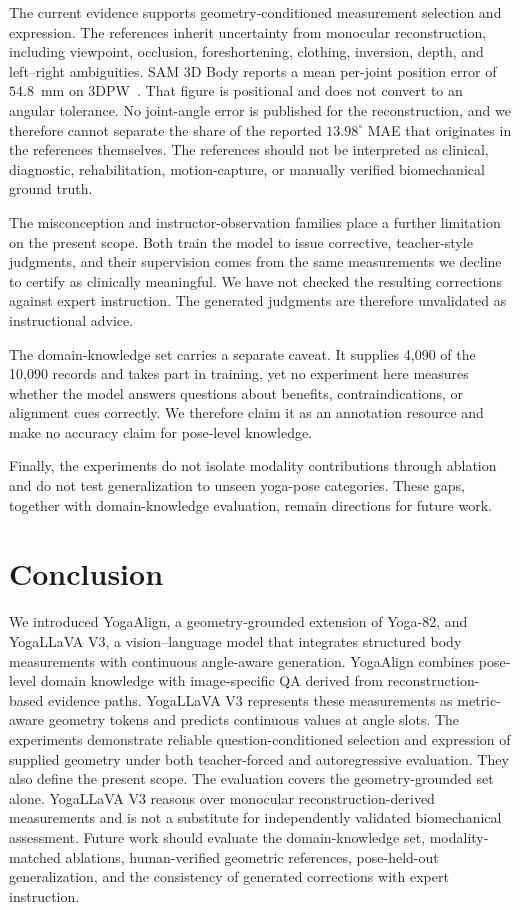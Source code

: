 \documentclass[conference]{IEEEtran}
\begin{document}
The current evidence supports geometry-conditioned measurement selection and expression.
The references inherit uncertainty from monocular reconstruction, including viewpoint, occlusion, foreshortening, clothing, inversion, depth, and left--right ambiguities.
SAM 3D Body reports a mean per-joint position error of $54.8$~mm on 3DPW~\cite{yang2026sam3dbody}.
That figure is positional and does not convert to an angular tolerance.
No joint-angle error is published for the reconstruction, and we therefore cannot separate the share of the reported $13.98^\circ$ MAE that originates in the references themselves.
The references should not be interpreted as clinical, diagnostic, rehabilitation, motion-capture, or manually verified biomechanical ground truth.

The misconception and instructor-observation families place a further limitation on the present scope.
Both train the model to issue corrective, teacher-style judgments, and their supervision comes from the same measurements we decline to certify as clinically meaningful.
We have not checked the resulting corrections against expert instruction.
The generated judgments are therefore unvalidated as instructional advice.

The domain-knowledge set carries a separate caveat.
It supplies 4,090 of the 10,090 records and takes part in training, yet no experiment here measures whether the model answers questions about benefits, contraindications, or alignment cues correctly.
We therefore claim it as an annotation resource and make no accuracy claim for pose-level knowledge.

Finally, the experiments do not isolate modality contributions through ablation and do not test generalization to unseen yoga-pose categories.
These gaps, together with domain-knowledge evaluation, remain directions for future work.
\section{Conclusion}
\label{sec:conclusion}

We introduced YogaAlign, a geometry-grounded extension of Yoga-82, and YogaLLaVA V3, a vision--language model that integrates structured body measurements with continuous angle-aware generation.
YogaAlign combines pose-level domain knowledge with image-specific QA derived from reconstruction-based evidence paths.
YogaLLaVA V3 represents these measurements as metric-aware geometry tokens and predicts continuous values at angle slots.
The experiments demonstrate reliable question-conditioned selection and expression of supplied geometry under both teacher-forced and autoregressive evaluation.
They also define the present scope.
The evaluation covers the geometry-grounded set alone.
YogaLLaVA V3 reasons over monocular reconstruction-derived measurements and is not a substitute for independently validated biomechanical assessment.
Future work should evaluate the domain-knowledge set, modality-matched ablations, human-verified geometric references, pose-held-out generalization, and the consistency of generated corrections with expert instruction.
\appendices
\end{document}
